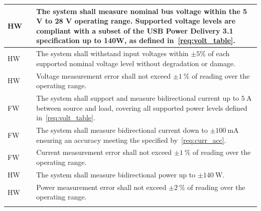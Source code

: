\begin{longtable}{@{} L{1cm} L{1.5cm} L{12.5cm} @{} }
HW &  &
The system shall measure nominal bus voltage within the 5 V to 28 V operating range. Supported voltage levels are compliant with a subset of the USB Power Delivery 3.1 specification up to 140W, as defined in~\ref{req:volt_table}.\\
\midrule

HW &  &
The system shall withstand input voltages within $\pm 5\%$ of each supported nominal voltage level without degradation or damage.\\
\midrule

HW &  &
Voltage measurement error shall not exceed $\pm\SI{1}{\percent}$ of reading over the operating range.\\



\addlinespace
{}
\addlinespace

FW &  &
The system shall support and measure bidirectional current up to $\SI{5}{\ampere}$ between source and load, covering all supported power levels defined in~\ref{req:volt_table}.\\
\midrule

FW &  &
The system shall measure bidirectional current down to $\pm\SI{100}{\milli\ampere}$ ensuring an accuracy meeting the specified by~\ref{req:curr_acc}.\\
\midrule

FW &  &
Current measurement error shall not exceed $\pm\SI{1}{\percent}$ of reading over the operating range.\\



\addlinespace
{}
\addlinespace

HW &  &
The system shall measure bidirectional power up to $\pm\SI{140}{\watt}$.\\
\midrule

HW &  &
Power measurement error shall not exceed $\pm\SI{2}{\percent}$ of reading over the operating range.\\



\addlinespace
{}
\addlinespace


\end{longtable}
